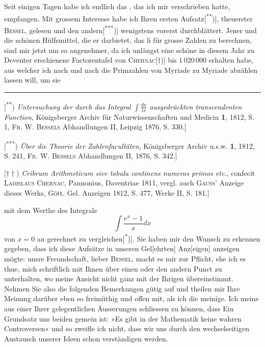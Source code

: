 \noindent\hspace*{\parindent}Seit einigen Tagen habe ich endlich das , das ich mir verschrieben hatte, empfangen. Mit grossem Interesse habe ich Ihren ersten Aufsatz[\textsuperscript{**})], theuerster \textsc{Bessel}, gelesen und den andern[\textsuperscript{***})] wenigstens vorerst durchblättert. Jener und die schönen Hülfsmittel, die er darbietet, das li für grosse Zahlen zu berechnen, sind mir jetzt um so angenehmer, da ich unlängst eine schöne in diesem Jahr zu Deventer erschienene Factorentafel von \textsc{Chernac}[$\dagger$)] bis $1\,020\,000$ erhalten habe, aus welcher ich nach und nach die Primzahlen von Myriade zu Myriade abzählen lassen will, um sie
\par\medskip\noindent\rule{.24\linewidth}{.4pt}\par\smallskip
{\small
\noindent\hspace*{\parindent}[\textsuperscript{**}) \textit{Untersuchung der durch das Integral $\displaystyle\int\frac{dx}{lx}$ ausgedrückten transcendenten Function}, Königsberger Archiv für Naturwissenschaften und Medicin \textbf{1}, 1812, S. 1, \textsc{Fr. W. Bessels} Abhandlungen II, Leipzig 1876, S. 330.]
\par\noindent\hspace*{\parindent}[\textsuperscript{***}) \textit{Über die Theorie der Zahlenfacultäten}, Königsberger Archiv u.s.w. \textbf{1}, 1812, S. 241, \textsc{Fr. W. Bessels} Abhandlungen II, 1876, S. 342.]
\par\noindent\hspace*{\parindent}[$\dagger\dagger$) \textit{Cribrum Arithmeticum sive tabula continens numeros primos etc.}, confecit \textsc{Ladislaus Chernac}, Pannonius, Daventriae 1811, vergl. auch \textsc{Gauss}’ Anzeige dieses Werks, Gött. Gel. Anzeigen 1812, S. 477, Werke II, S. 181.]
\par}
\clearpage{}
\noindent mit dem Werthe des Integrals
\[
\int\frac{e^x-1}{x}dx
\]
\noindent von $x=0$ an gerechnet zu vergleichen[\textsuperscript{*})]. Sie haben mir den Wunsch zu erkennen gegeben, dass ich diese Aufsätze in unseren Gel[ehrten] Anz[eigen] anzeigen mögte: unsre Freundschaft, lieber \textsc{Bessel}, macht es mir zur Pflicht, ehe ich es thue, mich schriftlich mit Ihnen über einen oder den andern Punct zu unterhalten, wo meine Ansicht nicht ganz mit der Ihrigen übereinstimmt. Nehmen Sie also die folgenden Bemerkungen gütig auf und theilen mir Ihre Meinung darüber eben so freimüthig und offen mit, als ich die meinige. Ich meine aus einer Ihrer gelegentlichen Äusserungen schliessen zu können, dass Ein Grundsatz uns beiden gemein ist: »Es gibt in der Mathematik keine wahren Controversen« und so zweifle ich nicht, dass wir uns durch den wechselseitigen Austausch unserer Ideen schon verständigen werden.

